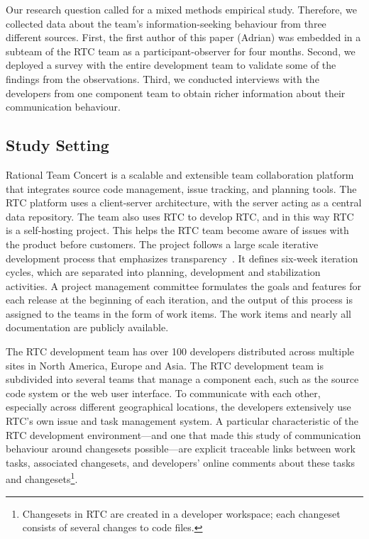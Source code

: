 Our research question called for a mixed methods empirical study. Therefore, we collected data about the team's information-seeking behaviour from three different sources.
First, the first author of this paper (Adrian) was embedded in a subteam of the RTC team as a participant-observer for four months.
Second, we deployed a survey with the entire development team to validate some of the findings from the observations.
Third, we conducted interviews with the developers from one component team to obtain richer information about their communication behaviour.

\subsection{Study Setting}
\label{sec:rtc}
 
Rational Team Concert is a scalable and extensible team collaboration platform that integrates source code management, issue tracking, and planning tools. The RTC platform uses a client-server architecture, with the server acting as a central data repository.
The team also uses RTC to develop RTC, and in this way RTC is a self-hosting project.
This helps the RTC team become aware of issues with the product before customers.%
The project follows a large scale iterative development process that emphasizes transparency~\cite{frost:ieeesoftware:2007}.
It defines six-week iteration cycles, which are  separated into planning, development and stabilization activities. A project management committee formulates the goals and features for each release at the beginning of each iteration, and the output of this process is assigned to the teams in the form of work items. The work items and nearly all documentation are publicly available.  %

The RTC development team has over 100 developers distributed across multiple sites in North America, Europe and Asia.  The RTC development team is subdivided into several teams that manage a component each, such as the source code system or the web user interface. To communicate with each other, especially across different geographical locations, the developers extensively use RTC's own issue and task management system. A particular characteristic of the RTC development environment---and one that made this study of communication behaviour around changesets possible---are explicit traceable links between work tasks, associated changesets, and developers' online comments about these tasks and changesets\footnote{Changesets in RTC are created in a developer workspace; each changeset consists of several changes to code files.}.

